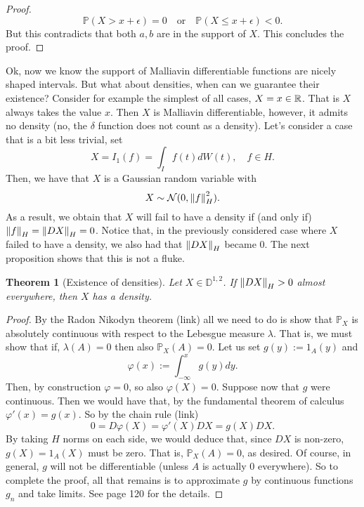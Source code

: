 \documentclass[12pt]{article}
\newtheorem{theorem}{Theorem}
\begin{document}
\begin{CJK*}{UTF8}{gbsn}
\begin{proof}
		\begin{equation*}
			\mathbb{P}(X>x+\epsilon)=0\quad \text{or}\quad \mathbb{P}(X\leq x+\epsilon)<0 .
		\end{equation*}
		But this contradicts that both $a,b$ are in the support of $X$. This concludes the proof.
	\end{proof}
	Ok, now we know the support of Malliavin differentiable functions are nicely shaped intervals. But what about densities, when can we guarantee their existence? Consider for example the simplest of all cases, $X=x\in {\mathbb R}$. That is $X$ always takes the value  $x$. Then  $X$ is Malliavin differentiable, however, it admits no density (no, the $\delta $ function does not count as a density).
	Let's consider a case that is a bit less trivial, set  $$X=I_1(f)= \int_{I}f(t) dW(t),\quad f \in H.$$  Then, we have that $X$ is a Gaussian random variable with  $$X\sim \mathcal{N}(0,\norm{f}^2_{H}).$$ As a result, we obtain that $X$  will fail to have a density if (and only if) $\norm{f}_{H}=\norm{DX}_{H}=0$. Notice that, in the previously considered case where $X$ failed to have a density, we also had that $\norm{DX}_{H}$ became $0$.  The next proposition shows that this is not a fluke.
	\begin{theorem}[Existence of densities]
		Let $X\in \mathbb{D}^{1,2}$. If $\norm{DX}_{H}>0$ almost everywhere, then $X$ has a density.
	\end{theorem}
	\begin{proof}
		By the Radon Nikodyn theorem (link) all we need to do is show that $\mathbb{P}_X$ is absolutely continuous with respect to the Lebesgue measure $\lambda$. That is, we must show that if, $\lambda (A)=0$ then also $\mathbb{P}_X(A)=0$. Let us set $g(y):=1_A(y)$ and
		\begin{equation*}
			\varphi(x):=\int_{-\infty}^x g(y)dy.
		\end{equation*}
		Then, by construction $\varphi=0$, so also $\varphi(X)=0$. Suppose now that $g$ were continuous. Then we would have that, by the fundamental theorem of calculus $\varphi'(x)=g(x)$. So by the chain rule (link)
		\begin{equation*}
			0=D \varphi(X)=\varphi'(X)DX=g(X)DX.
		\end{equation*}
		By taking $H$ norms on each side, we would deduce that, since $DX$ is non-zero, $g(X)=1_A(X)$ must be zero. That is, $\mathbb{P}_X(A)=0$, as desired. Of course, in general, $g$ will not be differentiable (unless $A$ is actually  $0$ everywhere). So to complete the proof, all that remains is to approximate $g$ by continuous functions $g_n$ and take limits. See \cite{nualart2018introduction} page 120 for the details.

\end{proof}
\end{CJK*}
\end{document}
